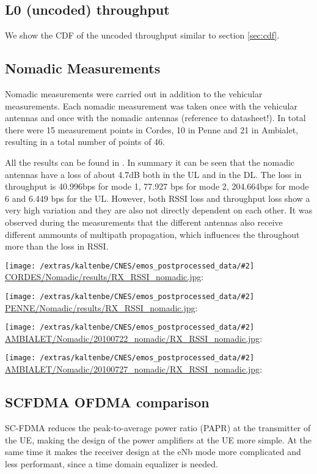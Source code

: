 \documentclass[a4paper,10pt]{article}
\newcommand{\printfile}[2][]{
 \begin{minipage}{8cm}
  \centering
  \texttt{[image: /extras/kaltenbe/CNES/emos\_postprocessed\_data/\#2]}
  \url{#2}: #1

 \end{minipage}
}
\begin{document}


\subsection{L0 (uncoded) throughput}

We show the CDF of the uncoded throughput similar to section \ref{sec:cdf}.

\subsection{Nomadic Measurements}

Nomadic measurements were carried out in addition to the vehicular measurements. Each nomadic measurement was taken once with the vehicular antennas and once with the nomadic antennas (reference to datasheet!). In total there were 15 measurement points in Cordes, 10 in Penne and 21 in Ambialet, resulting in a total number of points of 46.

All the results can be found in \cite{nomadic}. In summary it can be seen that the nomadic antennas have a loss of about 4.7dB both in the UL and in the DL. The loss in throughput is 40.996bps for mode 1, 77.927 bps for mode 2, 204.664bps for mode 6 and 6.449 bps for the UL. However, both RSSI loss and throughput loss show a very high variation and they are also not directly dependent on each other. It was observed during the measurements that the different antennas also receive different ammounts of multipath propagation, which influences the throughout more than the loss in RSSI.  

\printfile{CORDES/Nomadic/results/RX_RSSI_nomadic.jpg}
\printfile{PENNE/Nomadic/results/RX_RSSI_nomadic.jpg}

\printfile{AMBIALET/Nomadic/20100722_nomadic/RX_RSSI_nomadic.jpg}
\printfile{AMBIALET/Nomadic/20100727_nomadic/RX_RSSI_nomadic.jpg}

\subsection{SCFDMA OFDMA comparison}

SC-FDMA reduces the peak-to-average power ratio (PAPR) at the transmitter of the UE, making the design of the power amplifiers at the UE more simple. At the same time it makes the receiver design at the eNb mode more complicated and less performant, since a time domain equalizer is needed. 
\end{document}
